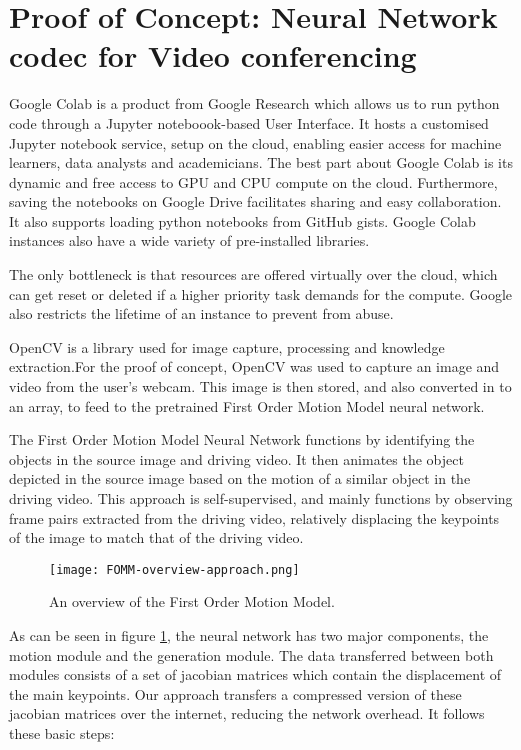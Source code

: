 \section{Proof of Concept: Neural Network codec for Video conferencing}

Google Colab is a product from Google Research which allows us to run python code through a Jupyter noteboook-based User Interface. 
It hosts a customised Jupyter notebook service, setup on the cloud, enabling easier access for machine learners, data analysts and 
academicians. The best part about Google Colab is its dynamic and free access to GPU and CPU compute on the cloud. Furthermore, saving 
the notebooks on Google Drive facilitates sharing and easy collaboration. It also supports loading python notebooks from GitHub gists. 
Google Colab instances also have a wide variety of pre-installed libraries.

The only bottleneck is that resources are offered virtually over the cloud, which can get reset or deleted if a higher priority task demands 
for the compute. Google also restricts the lifetime of an instance to prevent from abuse.

OpenCV is a library used for image capture, processing and knowledge extraction.For the proof of concept, OpenCV was used to capture an image 
and video from the user's webcam. This image is then stored, and also converted in to an array, to feed to the pretrained First Order Motion Model 
neural network.

The First Order Motion Model Neural Network functions by identifying the objects in the source image and driving video. It then animates the object 
depicted in the source image based on the motion of a similar object in the driving video. This approach is self-supervised, and mainly functions by 
observing frame pairs extracted from the driving video, relatively displacing the keypoints of the image to match that of the driving video.

\begin{figure}[h]
    \begin{center}
        \texttt{[image: FOMM-overview-approach.png]}
    \end{center}
    \caption{An overview of the First Order Motion Model.}
    \label{fig:FOMMoverview}
\end{figure}

As can be seen in figure \ref{fig:FOMMoverview}, the neural network has two major components, the motion module and the generation module. 
The data transferred between both modules consists of a set of jacobian matrices which contain the displacement of the main keypoints. 
Our approach transfers a compressed version of these jacobian matrices over the internet, reducing the network overhead. It follows these basic steps: 

